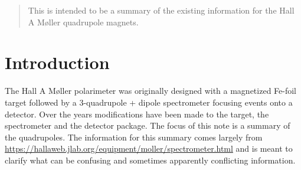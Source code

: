 \documentclass[12pt]{article}
\begin{document}
\maketitle

\begin{abstract}
This is intended to be a summary of the existing information for the Hall A M\o ller quadrupole magnets.
\end{abstract}

\section{Introduction}
The Hall A M\o ller polarimeter was originally designed with a magnetized Fe-foil target followed by a 3-quadrupole + dipole spectrometer focusing events onto a detector. Over the years modifications have been made to the target, the spectrometer and the detector package. The focus of this note is a summary of the quadrupoles. The information for this summary comes largely from \href{https://hallaweb.jlab.org/equipment/moller/spectrometer.html}{https://hallaweb.jlab.org/equipment/moller/spectrometer.html} and is meant to clarify what can be confusing and sometimes apparently conflicting information. 
\end{document}
